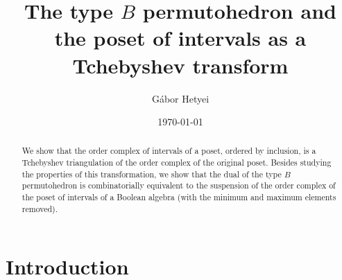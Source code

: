 \documentclass[reqno,12pt]{amsart}
\numberwithin{equation}{section}
\newcommand{\0}{\widehat{0}}
\newcommand{\1}{\widehat{1}}
\newcommand{\2}{\widehat{2}}
\begin{document}

\title[The poset of intervals]{The type $B$ permutohedron and the
poset of intervals as a Tchebyshev transform}


\author[G\'abor Hetyei]{G\'abor Hetyei}

\address{Department of Mathematics and Statistics,
  UNC-Charlotte, Charlotte NC 28223-0001.
WWW: \tt http://webpages.uncc.edu/ghetyei/.}



\date{\today}




\begin{abstract}
We show that the order complex of intervals of a poset, ordered by
inclusion, is a Tchebyshev triangulation of the order complex of the
original poset. Besides studying the properties of this transformation,
we show that the dual of the type $B$ permutohedron is combinatorially
equivalent to the suspension of the order complex of the poset of
intervals of a Boolean algebra (with the minimum and maximum elements
removed).    
\end{abstract}
\maketitle

\section*{Introduction}
\end{document}
